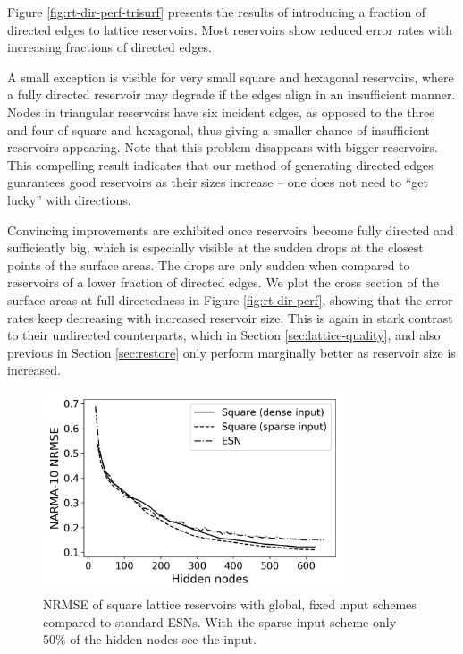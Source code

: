 Figure \ref{fig:rt-dir-perf-trisurf} presents the results of introducing a
fraction of directed edges to lattice reservoirs. Most reservoirs show reduced
error rates with increasing fractions of directed edges.

A small exception is visible for very small square and hexagonal reservoirs,
where a fully directed reservoir may degrade if the edges align in an
insufficient manner. Nodes in triangular reservoirs have six incident edges, as
opposed to the three and four of square and hexagonal, thus giving a smaller
chance of insufficient reservoirs appearing. Note that this problem disappears
with bigger reservoirs. This compelling result indicates that our method of
generating directed edges guarantees good reservoirs as their sizes increase --
one does not need to ``get lucky'' with directions.

Convincing improvements are exhibited once reservoirs become fully directed and
sufficiently big, which is especially visible at the sudden drops at the closest
points of the surface areas. The drops are only sudden when compared to
reservoirs of a lower fraction of directed edges. We plot the cross section of
the surface areas at full directedness in Figure \ref{fig:rt-dir-perf}, showing
that the error rates keep decreasing with increased reservoir size. This is
again in stark contrast to their undirected counterparts, which in Section
\ref{sec:lattice-quality}, and also previous in Section \ref{sec:restore} only
perform marginally better as reservoir size is increased.

\begin{figure}
  \centering
  \includegraphics[width=3.5in]{figures/rt-performance-big.png}
  \caption{
    NRMSE of square lattice reservoirs with global, fixed input schemes compared
to standard ESNs. With the sparse input scheme only 50\% of the hidden nodes see
the input.
  }
  \label{fig:rt-performance-big}
\end{figure}

